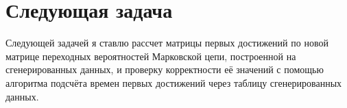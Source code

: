 \documentclass[specialist, substylefile = spbu_report.rtx, subf,href,colorlinks=true, 12pt]{disser}
\begin{document}
\chapter{Следующая задача}

Следующей задачей я ставлю рассчет матрицы первых достижений по новой матрице переходных вероятностей Марковской цепи, построенной на сгенерированных данных, и проверку корректности её значений с помощью алгоритма подсчёта времен первых достижений через таблицу сгенерированных данных.










 












 
\end{document}
